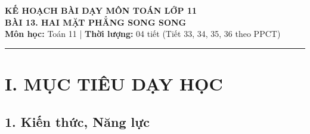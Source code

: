 \documentclass[12pt, a4paper]{article}
\begin{document}
\begin{center}
    {\Large \textbf{KẾ HOẠCH BÀI DẠY MÔN TOÁN LỚP 11}}\\[0.4em]
    {\LARGE \textbf{BÀI 13. HAI MẶT PHẲNG SONG SONG}}\\[0.5em]
    \textbf{Môn học:} Toán 11 | \textbf{Thời lượng:} 04 tiết (Tiết 33, 34, 35, 36 theo PPCT)
\end{center}

\vspace{0.5em}
\hrule
\vspace{1em}

\section*{I. MỤC TIÊU DẠY HỌC}

\subsection*{1. Kiến thức, Năng lực}
\end{document}
